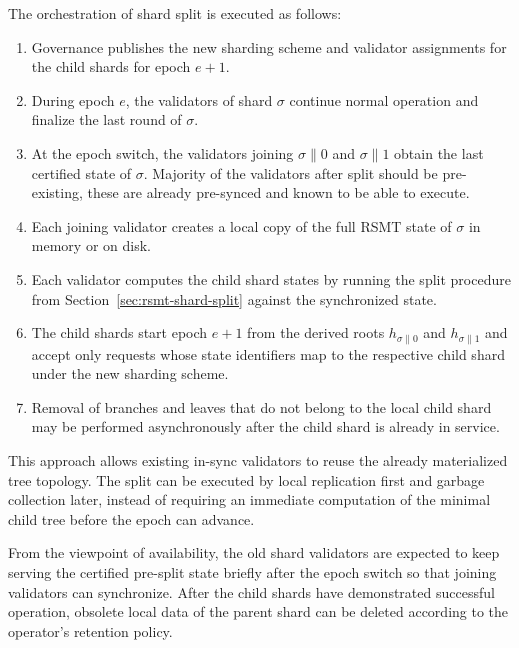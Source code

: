 The orchestration of shard split is executed as follows:
\begin{enumerate}
	\item Governance publishes the new sharding scheme and validator assignments for the child shards for epoch $e+1$.
	\item During epoch $e$, the validators of shard $\sigma$ continue normal operation and finalize the last round of $\sigma$.
	\item At the epoch switch, the validators joining $\sigma\|0$ and $\sigma\|1$ obtain the last certified state of $\sigma$. Majority of the validators after split should be pre-existing, these are already pre-synced and known to be able to execute.
	\item Each joining validator creates a local copy of the full RSMT state of $\sigma$ in memory or on disk.
	\item Each validator computes the child shard states by running the split procedure from Section~\ref{sec:rsmt-shard-split} against the synchronized state.
	\item The child shards start epoch $e+1$ from the derived roots $h_{\sigma\|0}$ and $h_{\sigma\|1}$ and accept only requests whose state identifiers map to the respective child shard under the new sharding scheme.
	\item Removal of branches and leaves that do not belong to the local child shard may be performed asynchronously after the child shard is already in service.
\end{enumerate}

This approach allows existing in-sync validators to reuse the already materialized tree topology. The split can be executed by local replication first and garbage collection later, instead of requiring an immediate  computation of the minimal child tree before the epoch can advance.

From the viewpoint of availability, the old shard validators are expected to keep serving the certified pre-split state briefly after the epoch switch so that joining validators can synchronize. After the child shards have demonstrated successful operation, obsolete local data of the parent shard can be deleted according to the operator's retention policy.
